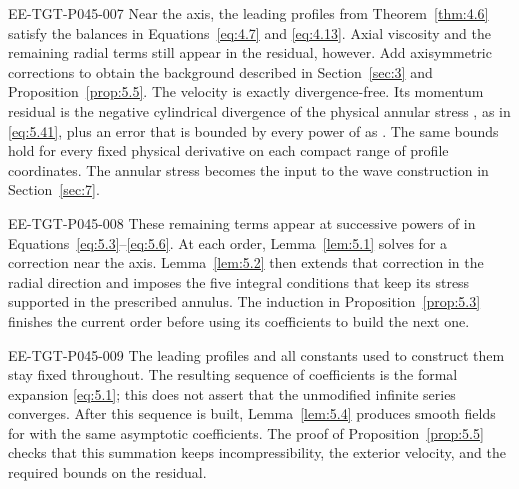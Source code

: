 \begin{EESegment}{EE-TGT-P045-007}
Near the axis, the leading profiles
 from Theorem~\ref{thm:4.6} satisfy the balances in
Equations~\eqref{eq:4.7} and \eqref{eq:4.13}. Axial viscosity and the remaining radial terms still
appear in the residual, however. Add axisymmetric corrections to obtain the background
 described in Section~\ref{sec:3} and
Proposition~\ref{prop:5.5}. The velocity  is exactly divergence-free.
Its momentum residual is the negative cylindrical divergence of the physical annular stress
, as in \eqref{eq:5.41}, plus an error
 that is bounded by every power of
 as . The same bounds hold for every fixed
physical derivative on each compact range of profile coordinates. The annular stress becomes the
input to the wave construction in Section~\ref{sec:7}.
\end{EESegment}

\begin{EESegment}{EE-TGT-P045-008}
These remaining terms appear at successive powers of
 in Equations~\eqref{eq:5.3}--\eqref{eq:5.6}. At each order,
Lemma~\ref{lem:5.1} solves for a correction near the axis. Lemma~\ref{lem:5.2} then extends that
correction in the radial direction and imposes the five integral conditions that keep its stress
supported in the prescribed annulus. The induction in Proposition~\ref{prop:5.3} finishes the current
order before using its coefficients to build the next one.
\end{EESegment}

\begin{EESegment}{EE-TGT-P045-009}
The leading profiles and all constants used to construct them stay fixed throughout. The resulting
sequence of coefficients is the formal expansion \eqref{eq:5.1}; this does not assert that the
unmodified infinite series converges. After this sequence is built, Lemma~\ref{lem:5.4}
produces smooth fields for  with the same asymptotic coefficients. The
proof of Proposition~\ref{prop:5.5} checks that this summation keeps incompressibility, the exterior
velocity, and the required bounds on the residual.
\end{EESegment}


